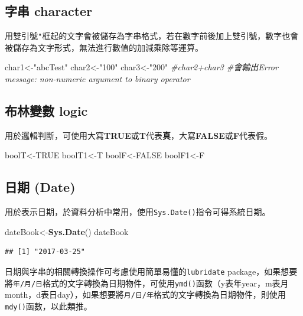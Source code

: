 \documentclass[]{book}
\newenvironment{Shaded}{\begin{snugshade}}{\end{snugshade}}
\newcommand{\KeywordTok}[1]{\textcolor[rgb]{0.13,0.29,0.53}{\textbf{{#1}}}}
\newcommand{\StringTok}[1]{\textcolor[rgb]{0.31,0.60,0.02}{{#1}}}
\newcommand{\CommentTok}[1]{\textcolor[rgb]{0.56,0.35,0.01}{\textit{{#1}}}}
\newcommand{\OtherTok}[1]{\textcolor[rgb]{0.56,0.35,0.01}{{#1}}}
\newcommand{\NormalTok}[1]{{#1}}
\theoremstyle{definition}
\theoremstyle{definition}
\theoremstyle{remark}
\begin{document}
\subsection{字串 character}\label{-character}

用雙引號\texttt{"}框起的文字會被儲存為字串格式，若在數字前後加上雙引號，數字也會被儲存為文字形式，無法進行數值的加減乘除等運算。

\begin{Shaded}
\begin{Highlighting}[]
\NormalTok{char1<-}\StringTok{"abcTest"} 
\NormalTok{char2<-}\StringTok{"100"}
\NormalTok{char3<-}\StringTok{"200"}
\CommentTok{#char2+char3 #會輸出Error message: non-numeric argument to binary operator}
\end{Highlighting}
\end{Shaded}

\subsection{布林變數 logic}\label{-logic}

用於邏輯判斷，可使用大寫\textbf{TRUE}或\textbf{T}代表\textbf{真}，大寫\textbf{FALSE}或\textbf{F}代表假。

\begin{Shaded}
\begin{Highlighting}[]
\NormalTok{boolT<-}\OtherTok{TRUE}
\NormalTok{boolT1<-T}
\NormalTok{boolF<-}\OtherTok{FALSE}
\NormalTok{boolF1<-F}
\end{Highlighting}
\end{Shaded}

\subsection{日期 (Date)}\label{-date}

用於表示日期，於資料分析中常用，使用\texttt{Sys.Date()}指令可得系統日期。

\begin{Shaded}
\begin{Highlighting}[]
\NormalTok{dateBook<-}\KeywordTok{Sys.Date}\NormalTok{()}
\NormalTok{dateBook}
\end{Highlighting}
\end{Shaded}

\begin{verbatim}
## [1] "2017-03-25"
\end{verbatim}

日期與字串的相關轉換操作可考慮使用簡單易懂的\texttt{lubridate}\citep{R-lubridate}
package，如果想要將\texttt{年/月/日}格式的文字轉換為日期物件，可使用\texttt{ymd()}函數（y表年year，m表月month，d表日day），如果想要將\texttt{月/日/年}格式的文字轉換為日期物件，則使用\texttt{mdy()}函數，以此類推。
\end{document}
